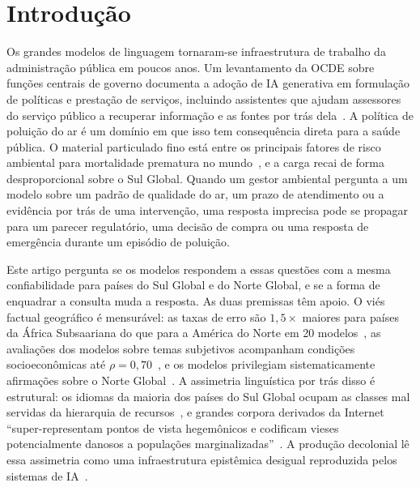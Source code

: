 \section{Introdução}
\label{sec:intro}

Os grandes modelos de linguagem tornaram-se infraestrutura de trabalho da
administração pública em poucos anos. Um levantamento da OCDE sobre funções
centrais de governo documenta a adoção de IA generativa em formulação de
políticas e prestação de serviços, incluindo assistentes que ajudam assessores
do serviço público a recuperar informação e as fontes por trás
dela~\citep{oecd2024governing}. A política de poluição do ar é um domínio em que
isso tem consequência direta para a saúde pública. O material particulado fino
está entre os principais fatores de risco ambiental para mortalidade prematura
no mundo~\citep{gbd2019risk,who2021aqg}, e a carga recai de forma
desproporcional sobre o Sul Global. Quando um gestor ambiental pergunta a um
modelo sobre um padrão de qualidade do ar, um prazo de atendimento ou a
evidência por trás de uma intervenção, uma resposta imprecisa pode se propagar
para um parecer regulatório, uma decisão de compra ou uma resposta de emergência
durante um episódio de poluição.

Este artigo pergunta se os modelos respondem a essas questões com a mesma
confiabilidade para países do Sul Global e do Norte Global, e se a forma de
enquadrar a consulta muda a resposta. As duas premissas têm apoio. O viés
factual geográfico é mensurável: as taxas de erro são $1,5\times$ maiores para
países da África Subsaariana do que para a América do Norte em 20
modelos~\citep{moayeri2024worldbench}, as avaliações dos modelos sobre temas
subjetivos acompanham condições socioeconômicas até
$\rho=0,70$~\citep{manvi2024llm}, e os modelos privilegiam sistematicamente
afirmações sobre o Norte Global~\citep{mirza2024global}. A assimetria linguística
por trás disso é estrutural: os idiomas da maioria dos países do Sul Global
ocupam as classes mal servidas da hierarquia de recursos~\citep{joshi2020state},
e grandes corpora derivados da Internet ``super-representam pontos de vista
hegemônicos e codificam vieses potencialmente danosos a populações
marginalizadas''~\citep{bender2021stochastic}. A produção decolonial lê essa
assimetria como uma infraestrutura epistêmica desigual reproduzida pelos
sistemas de IA~\citep{mohamed2020decolonial}.

